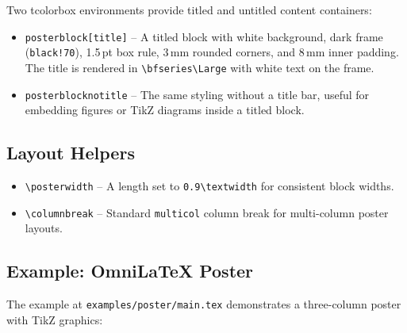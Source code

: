 Two tcolorbox environments provide titled and untitled content containers:

\begin{itemize}
    \item \texttt{posterblock[title]} -- A titled block with white
          background, dark frame (\texttt{black!70}), 1.5\,pt box rule,
          3\,mm rounded corners, and 8\,mm inner padding.  The title is
          rendered in \texttt{\textbackslash bfseries\textbackslash Large}
          with white text on the frame.
    \item \texttt{posterblocknotitle} -- The same styling without a title
          bar, useful for embedding figures or TikZ diagrams inside a
          titled block.
\end{itemize}

\subsection{Layout Helpers}

\begin{itemize}
    \item \texttt{\textbackslash posterwidth} -- A length set to
          \texttt{0.9\textbackslash textwidth} for consistent block widths.
    \item \texttt{\textbackslash columnbreak} -- Standard
          \texttt{multicol} column break for multi-column poster layouts.
\end{itemize}

\subsection{Example: OmniLaTeX Poster}

The example at \texttt{examples/poster/main.tex} demonstrates a
three-column poster with TikZ graphics:

